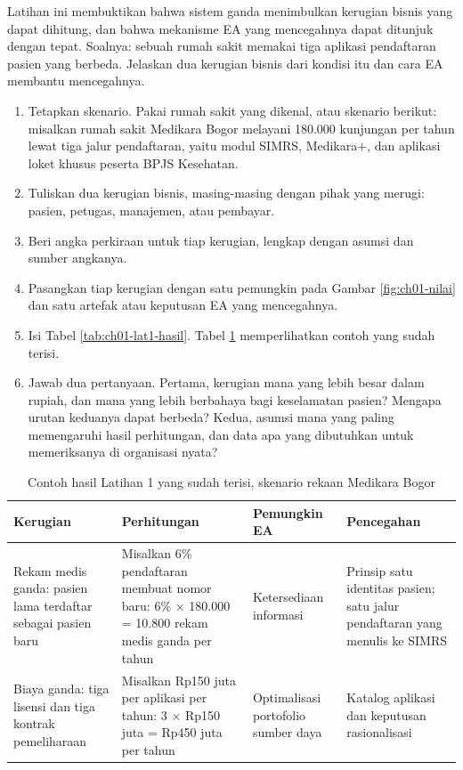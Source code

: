 Latihan ini membuktikan bahwa sistem ganda menimbulkan kerugian bisnis yang
dapat dihitung, dan bahwa mekanisme EA yang mencegahnya dapat ditunjuk dengan
tepat. Soalnya: sebuah rumah sakit memakai tiga aplikasi pendaftaran pasien
yang berbeda. Jelaskan dua kerugian bisnis dari kondisi itu dan cara EA
membantu mencegahnya.

\begin{enumerate}
  \item Tetapkan skenario. Pakai rumah sakit yang dikenal, atau skenario
        berikut: misalkan rumah sakit Medikara Bogor melayani 180.000 kunjungan
        per tahun lewat tiga jalur pendaftaran, yaitu modul SIMRS, Medikara+,
        dan aplikasi loket khusus peserta BPJS Kesehatan.
  \item Tuliskan dua kerugian bisnis, masing-masing dengan pihak yang merugi:
        pasien, petugas, manajemen, atau pembayar.
  \item Beri angka perkiraan untuk tiap kerugian, lengkap dengan asumsi dan
        sumber angkanya.
  \item Pasangkan tiap kerugian dengan satu pemungkin pada Gambar
        \ref{fig:ch01-nilai} dan satu artefak atau keputusan EA yang
        mencegahnya.
  \item Isi Tabel \ref{tab:ch01-lat1-hasil}. Tabel \ref{tab:ch01-lat1-contoh}
        memperlihatkan contoh yang sudah terisi.
  \item Jawab dua pertanyaan. Pertama, kerugian mana yang lebih besar dalam
        rupiah, dan mana yang lebih berbahaya bagi keselamatan pasien? Mengapa
        urutan keduanya dapat berbeda? Kedua, asumsi mana yang paling
        memengaruhi hasil perhitungan, dan data apa yang dibutuhkan untuk
        memeriksanya di organisasi nyata?
\end{enumerate}

\begin{table}[!htb]
  \centering
  \caption{Contoh hasil Latihan 1 yang sudah terisi, skenario rekaan Medikara Bogor}
  \label{tab:ch01-lat1-contoh}
  \footnotesize
  \begin{tabularx}{\textwidth}{>{\raggedright\arraybackslash}p{2.4cm}
      >{\raggedright\arraybackslash}X >{\raggedright\arraybackslash}p{2.1cm}
      >{\raggedright\arraybackslash}X}
    \hline
    \textbf{Kerugian} & \textbf{Perhitungan} & \textbf{Pemungkin EA} & \textbf{Pencegahan} \\
    \hline
    Rekam medis ganda: pasien lama terdaftar sebagai pasien baru & Misalkan 6\% pendaftaran membuat nomor baru: 6\% $\times$ 180.000 = 10.800 rekam medis ganda per tahun & Ketersediaan informasi & Prinsip satu identitas pasien; satu jalur pendaftaran yang menulis ke SIMRS \\
    \hline
    Biaya ganda: tiga lisensi dan tiga kontrak pemeliharaan & Misalkan Rp150 juta per aplikasi per tahun: 3 $\times$ Rp150 juta = Rp450 juta per tahun & Optimalisasi portofolio sumber daya & Katalog aplikasi dan keputusan rasionalisasi \\
    \hline
  \end{tabularx}
\end{table}

